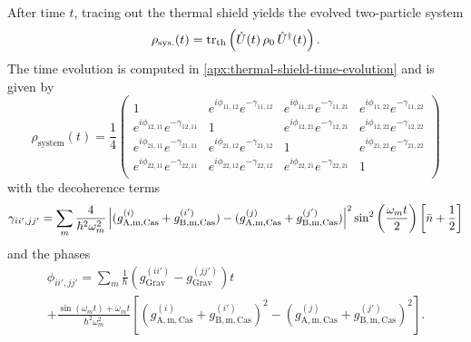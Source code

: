 After time $t$, tracing out the thermal shield yields the evolved two-particle system
\begin{equation}
  \rho_\mathrm{sys.}(t) = \tr_\mathrm{th}\left(\hat{U}(t) \, \rho_0 \, \hat{U}^\dagger(t)\right) .
\end{equation}
The time evolution is computed in \cref{apx:thermal-shield-time-evolution} and is given by
\begin{equation}
  \rho_\mathrm{system}(t) = \frac{1}{4} \begin{pmatrix}
    1 & e^{i\phi_{11,12}} e^{-\gamma_{11,12}} & e^{i\phi_{11,21}} e^{-\gamma_{11,21}} & e^{i\phi_{11,22}} e^{-\gamma_{11,22}} \\
    e^{i\phi_{12,11}} e^{-\gamma_{12,11}} & 1 & e^{i\phi_{12,21}} e^{-\gamma_{12,21}} & e^{i\phi_{12,22}} e^{-\gamma_{12,22}} \\
    e^{i\phi_{21,11}} e^{-\gamma_{21,11}} & e^{i\phi_{21,12}} e^{-\gamma_{21,12}} & 1 & e^{i\phi_{21,22}} e^{-\gamma_{21,22}} \\
    e^{i\phi_{22,11}} e^{-\gamma_{22,11}} & e^{i\phi_{22,12}} e^{-\gamma_{22,12}} & e^{i\phi_{22,21}} e^{-\gamma_{22,21}} & 1 \\
  \end{pmatrix}
\end{equation}
with the decoherence terms
\begin{equation}\label{eq:5:analytical-decoherence}
  \gamma_{ii',jj'} = \sum_m \frac{4}{\hbar^2\omega_m^2} \left\lvert(g^{(i)}_\mathrm{A,m,Cas} + g^{(i')}_\mathrm{B,m,Cas}) - (g^{(j)}_\mathrm{A,m,Cas} + g^{(j')}_\mathrm{B,m,Cas})\right\rvert^2 \sin^2\left(\frac{\omega_m t}{2}\right) \left[\bar{n} + \frac{1}{2}\right]
\end{equation}
and the phases
\begin{multline}\label{eq:5:analytical-phases}
  \phi_{ii',jj'} = \sum_m \frac{1}{\hbar} \left( g^{(ii')}_\mathrm{Grav} - g^{(jj')}_\mathrm{Grav} \right) t \\
  + \frac{\sin(\omega_m t)+\omega_m t}{\hbar^2\omega_m^2}\left[(g^{(i)}_\mathrm{A,m,Cas} + g^{(i')}_\mathrm{B,m,Cas})^2 - (g^{(j)}_\mathrm{A,m,Cas} + g^{(j')}_\mathrm{B,m,Cas})^2\right] .
\end{multline}

